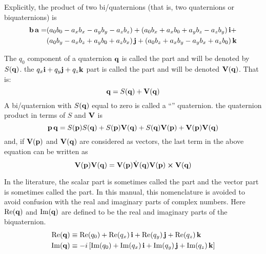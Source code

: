 Explicitly, the product of two bi/quaternions (that is, two quaternions or biquaternions) is
\begin{align}
  {\bf b} \, {\bf a} = &(a_0 b_0 - a_x b_x - a_y b_y - a_z b_z) +
                  (a_0 b_x + a_x b_0 + a_y b_z - a_z b_y) \, {\bf i} + \\
                 &(a_0 b_y - a_x b_z + a_y b_0 + a_z b_x) \, {\bf j} +
                  (a_0 b_z + a_x b_y - a_y b_x + a_z b_0) \, {\bf k} \nonumber
\end{align}

The $q_0$ component of a quaternion ${\bf q}$ is called the  part and will be denoted by
$S({\bf q})$.  the $q_x {\bf i} + q_y {\bf j} + q_z {\bf k}$ part is called the  part and will be
denoted ${\bf V}({\bf q})$. That is:
\begin{equation}
  {\bf q} = S({\bf q}) + {\bf V}({\bf q})
\end{equation}
A bi/quaternion with $S({\bf q})$ equal to zero is called a ``'' quaternion.
the quaternion product in terms of $S$ and ${\bf V}$ is
\begin{equation}
  {\bf p} \, {\bf q} = S({\bf p}) S({\bf q}) + S({\bf p}) {\bf V}({\bf q}) + S({\bf q}) {\bf V}({\bf p}) + {\bf V}({\bf p}) {\bf V}({\bf q})
\end{equation}
and, if ${\bf V}({\bf p})$ and ${\bf V}({\bf q})$ are considered as vectors, the last term in the above equation
can be written as
\begin{equation}
  {\bf V}({\bf p}) {\bf V}({\bf q}) = {\bf V}({\bf p}) \dot {{\bf V}}({\bf q}) {\bf V}({\bf p}) \mathbin{\boldsymbol{\times}} {\bf V}({\bf q})
\end{equation}

In the literature, the scalar part is sometimes called the  part and the vector part is
sometimes called the  part. In this manual, this nomenclature is avoided to avoid
confusion with the real and imaginary parts of complex numbers. Here $\operatorname{Re}({\bf q})$ and $\operatorname{Im}({\bf q})$ are
defined to be the real and imaginary parts of the biquaternion.
\begin{align}
  \operatorname{Re}({\bf q}) &\equiv \operatorname{Re}(q_0) + \operatorname{Re}(q_x) \, {\bf i} + \operatorname{Re}(q_y) \, {\bf j} + \operatorname{Re}(q_z) \, {\bf k} \nonumber \\
  \operatorname{Im}({\bf q}) &\equiv -i \left[ \operatorname{Im}(q_0) + \operatorname{Im}(q_x) \, {\bf i} + \operatorname{Im}(q_y) \, {\bf j} + \operatorname{Im}(q_z) \, {\bf k} \right]
\end{align}

